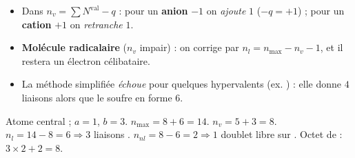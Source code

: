 \documentclass[11pt,a4paper]{article}
\begin{document}
\begin{piege}
\begin{itemize}[leftmargin=1.5em,topsep=2pt,itemsep=2pt]
  \item Dans $n_v = \sum N^{\text{val}} - q$ : pour un \textbf{anion} $-1$ on \emph{ajoute} $1$
        ($-q = +1$) ; pour un \textbf{cation} $+1$ on \emph{retranche} $1$.
  \item \textbf{Molécule radicalaire} ($n_v$ impair) : on corrige par $n_l = n_{\max} - n_v - 1$,
        et il restera un électron célibataire.
  \item La méthode simplifiée \emph{échoue} pour quelques hypervalents (ex. ) : elle donne
        $4$ liaisons alors que le soufre en forme $6$.
\end{itemize}
\end{piege}

\begin{exemplebox}
Atome central  ; $a=1$, $b=3$. \;
$n_{\max} = 8 + 6 = 14$. \;
$n_v = 5 + 3 = 8$. \;
$n_l = 14 - 8 = 6 \Rightarrow 3$ liaisons . \;
$n_{nl} = 8 - 6 = 2 \Rightarrow 1$ doublet libre sur . Octet de  : $3\times2+2 = 8$. \checkmark
\end{exemplebox}
\end{document}
